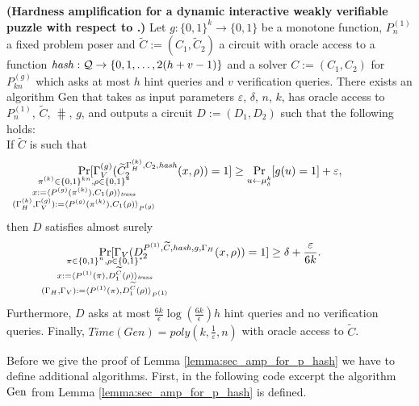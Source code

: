 %
%
\begin{lemma}\textbf{(Hardness amplification for a dynamic interactive weakly verifiable puzzle with respect to \boldmath{$\hash$}.)}
  \label{lemma:sec_amp_for_p_hash}
  Let $g: \{0,1\}^{k} \rightarrow \{0,1\}$ be a monotone function, $P_n^{(1)}$ a fixed
  problem poser and $\widetilde{C} := (C_1, \widetilde{C}_2)$ a circuit
  with oracle access to a function $\operatorname{\mathit{hash}}: \mathcal{Q} \rightarrow \{0,1,\dots, 2(h+v-1)\}$
  and a solver $C := (C_1, C_2)$ for $P_{kn}^{(g)}$ which asks at most $h$ hint queries and $v$ verification queries.
  There exists an algorithm Gen that takes as input parameters $\varepsilon$, $\delta$, $n$, $k$,
  has oracle access to $P_n^{(1)}$,  $\widetilde{C}$, $\hash$, $g$,
  and outputs a circuit $D := (D_1, D_2)$ such that the following holds: \\
  If $\widetilde{C}$ is such that
  \begin{align*}
    \underset{\mathclap{\substack{
          \pi^{(k)} \in \{0,1\}^{kn}, \rho \in \{0,1\}^{*} \\
          x:= \langle P^{(g)}(\pi^{(k)}), {C}_1(\rho) \rangle_{\mathit{trans}} \\
          (\Gamma_H^{(k)}, \Gamma_V^{(g)}) := \langle P^{(g)}(\pi^{(k)}), C_1(\rho) \rangle_{P^{(g)}}}}}
    {\Pr}[\Gamma_V^{(g)}(\widetilde{C}_2^{\Gamma_H^{(k)}, C_2, \hash}(x,\rho)) = 1]
    \geq \underset{u \leftarrow \mu_\delta^k}{\Pr}[g(u) = 1] + \varepsilon,
  \end{align*}
  then $D$ satisfies almost surely
  \begin{align*}
    \underset{
      \mathclap{
      \substack{
        \pi \in \{0,1\}^{n}, \rho \in \{0,1\}^{*} \\
        x := \langle P^{(1)}(\pi), D_1^{\widetilde{C}}(\rho) \rangle_{\mathit{trans}} \\
        (\Gamma_H, \Gamma_V) := \langle P^{(1)}(\pi), D_1^{\widetilde{C}}(\rho) \rangle_{P^{(1)}}}}}
    {\Pr}[\Gamma_V(D_2^{P^{(1)}, \widetilde{C}, \hash, g, \Gamma_H}(x, \rho)) = 1] \geq \delta + \frac{\varepsilon}{6k}.
  \end{align*}
  Furthermore, $D$
  asks at most $\frac{6k}{\epsilon}\log\left(\frac{6k}{\epsilon}\right) h$ hint queries and no verification queries.
  Finally, $\mathit{Time}(\mathit{Gen}) = \mathit{poly}(k, \frac{1}{\varepsilon}, n)$ with oracle access to $\widetilde{C}$.
\end{lemma}
%
Before we give the proof of Lemma \ref{lemma:sec_amp_for_p_hash} we have to define additional algorithms.
First, in the following code excerpt the algorithm $\operatorname{\text{Gen}}$ from Lemma \ref{lemma:sec_amp_for_p_hash} is defined.

